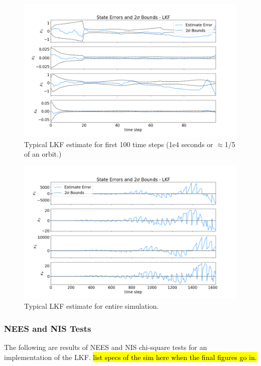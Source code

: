 \documentclass[11pt, a4paper]{article}
\begin{document}
\begin{figure}[H]
	\centering
	\includegraphics[width=\textwidth]{Figures/lkf_estimate_th_ZOOM.png}
	\caption{Typical LKF estimate for first 100 time steps (1e4 seconds or $\approx$1/5 of an orbit.)}
	\label{fig:lkf_est_zoom}
\end{figure}

\begin{figure}[H]
	\centering
	\includegraphics[width=\textwidth]{Figures/lkf_estimate_th.png}
	\caption{Typical LKF estimate for entire simulation.}
	\label{fig:lkf_est}
\end{figure}

\subsubsection{NEES and NIS Tests}
The following are results of NEES and NIS chi-square tests for an implementation of the LKF. 
\hl{list specs of the sim here when the final figures go in.} 
\end{document}
